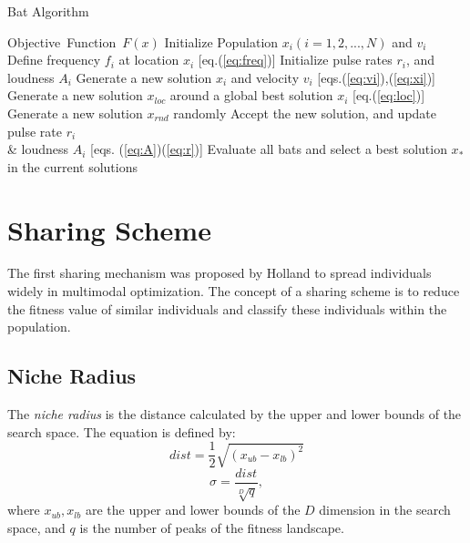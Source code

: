 \begin{algorithm}[H]
\caption{Bat Algorithm}
\label{code:ba}
\begin{algorithmic}[1]
\REQUIRE Objective\ Function\ $F(x)$
\STATE Initialize Population $x_i(i=1,2,..., N)$ and $v_i$\\
\STATE Define frequency $f_i$ at location $x_i$ [eq.(\ref{eq:freq})]
\STATE Initialize pulse rates $r_i$, and loudness $A_i$
\STATE Generate a new solution $x_i$ and velocity $v_i$ [eqs.(\ref{eq:vi}),(\ref{eq:xi})]
\STATE Generate a new solution $x_{loc}$ around a global best solution $x_i$ [eq.(\ref{eq:loc})] 
\ENDIF
\STATE Generate a new solution $x_{rnd}$ randomly
\STATE Accept the new solution, and update pulse rate $r_i$ \\ \& loudness $A_i$ [eqs. (\ref{eq:A})(\ref{eq:r})]  
\ENDIF
\STATE Evaluate all bats and select a best solution $x_*$ in the current solutions
\ENDFOR
\ENDWHILE
\end{algorithmic}
\end{algorithm}

\section{Sharing Scheme}
The first sharing mechanism was proposed by Holland \cite{SH01} to spread individuals widely in multimodal optimization. The concept of a sharing scheme is to reduce the fitness value of similar individuals and classify these individuals within the population.
\subsection{Niche Radius}
The \textit{niche radius} is the distance calculated by the upper and lower bounds of the search space. The equation is defined by:
\begin{equation}
\label{eq:dist}
dist =\frac{1}{2} \sqrt{(x_{ub}-x_{lb})^2}
\end{equation}
\begin{equation}
\label{eq:nr}
\sigma=\frac{dist}{\sqrt[D]{q}},
\end{equation}
where $x_{ub}, x_{lb}$ are the upper and lower bounds of the $D$ dimension in the search space, and $q$ is the number of peaks of the fitness landscape.

